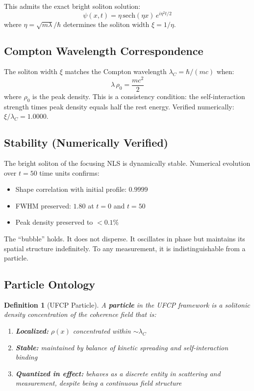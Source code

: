 \documentclass[11pt, a4paper]{article}
\newtheorem{definition}{Definition}[section]
\begin{document}
This admits the exact bright soliton solution:
\begin{equation}
  \psi(x,t) = \eta\,\mathrm{sech}(\eta x)\, e^{i\eta^2 t/2}
  \label{eq:soliton}
\end{equation}
where $\eta = \sqrt{m\lambda}/\hbar$ determines the soliton width
$\xi = 1/\eta$.

\subsection{Compton Wavelength Correspondence}

The soliton width $\xi$ matches the Compton wavelength
$\lambda_C = \hbar/(mc)$ when:
\begin{equation}
  \lambda\,\rho_0 = \frac{mc^2}{2}
  \label{eq:compton-match}
\end{equation}
where $\rho_0$ is the peak density. This is a consistency condition:
the self-interaction strength times peak density equals half the rest
energy. Verified numerically: $\xi/\lambda_C = 1.0000$.

\subsection{Stability (Numerically Verified)}

The bright soliton of the focusing NLS is dynamically stable.
Numerical evolution over $t = 50$ time units confirms:
\begin{itemize}[nosep]
  \item Shape correlation with initial profile: $0.9999$
  \item FWHM preserved: $1.80$ at $t = 0$ and $t = 50$
  \item Peak density preserved to $< 0.1\%$
\end{itemize}

The ``bubble'' holds. It does not disperse. It oscillates in phase
but maintains its spatial structure indefinitely. To any measurement,
it is indistinguishable from a particle.

\subsection{Particle Ontology}

\begin{definition}[UFCP Particle]
A \textbf{particle} in the UFCP framework is a solitonic density
concentration of the coherence field that is:
\begin{enumerate}[nosep]
  \item \textbf{Localized:} $\rho(x)$ concentrated within $\sim\lambda_C$
  \item \textbf{Stable:} maintained by balance of kinetic spreading
        and self-interaction binding
  \item \textbf{Quantized in effect:} behaves as a discrete entity in
        scattering and measurement, despite being a continuous field
        structure
\end{enumerate}
\end{definition}
\end{document}
